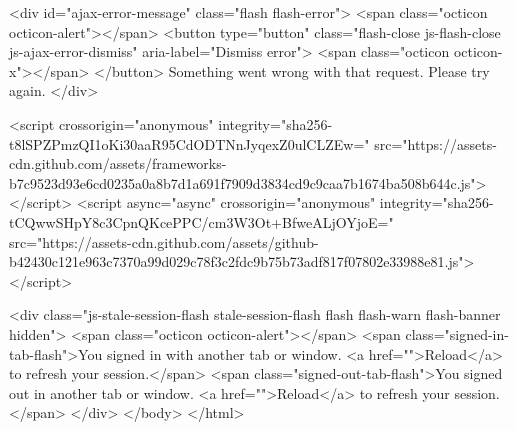     
    
    

    <div id="ajax-error-message" class="flash flash-error">
      <span class="octicon octicon-alert"></span>
      <button type="button" class="flash-close js-flash-close js-ajax-error-dismiss" aria-label="Dismiss error">
        <span class="octicon octicon-x"></span>
      </button>
      Something went wrong with that request. Please try again.
    </div>


      <script crossorigin="anonymous" integrity="sha256-t8lSPZPmzQI1oKi30aaR95CdODTNnJyqexZ0ulCLZEw=" src="https://assets-cdn.github.com/assets/frameworks-b7c9523d93e6cd0235a0a8b7d1a691f7909d3834cd9c9caa7b1674ba508b644c.js"></script>
      <script async="async" crossorigin="anonymous" integrity="sha256-tCQwwSHpY8c3CpnQKcePPC/cm3W3Ot+BfweALjOYjoE=" src="https://assets-cdn.github.com/assets/github-b42430c121e963c7370a99d029c78f3c2fdc9b75b73adf817f07802e33988e81.js"></script>
      
      
      
    <div class="js-stale-session-flash stale-session-flash flash flash-warn flash-banner hidden">
      <span class="octicon octicon-alert"></span>
      <span class="signed-in-tab-flash">You signed in with another tab or window. <a href="">Reload</a> to refresh your session.</span>
      <span class="signed-out-tab-flash">You signed out in another tab or window. <a href="">Reload</a> to refresh your session.</span>
    </div>
  </body>
</html>

